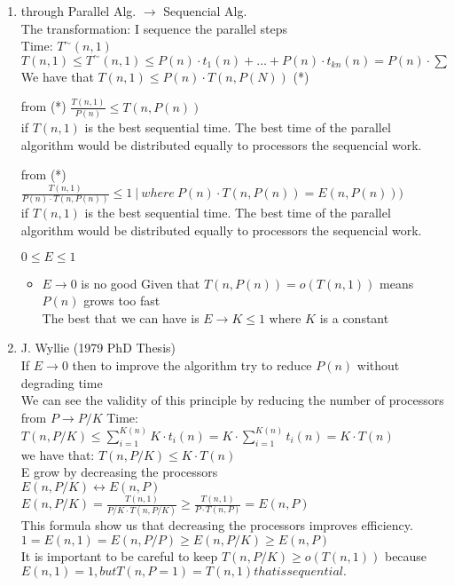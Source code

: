 \begin{enumerate}
 \item through Parallel Alg. $\rightarrow$ Sequencial Alg.\\
 The transformation: I sequence the parallel steps\\
 Time: $T^{\sim}(n,1)$\\
 $T(n,1) \leq T^{\sim}(n,1) \leq P(n) \cdot t_1(n) + \dots + P(n) \cdot t_{kn}(n) = P(n) \cdot \sum$\\
 We have that $T(n, 1) \leq P(n) \cdot T(n, P(N))$ (*)
 \begin{remark}
  from (*) $\frac{T(n,1)}{P(n)} \leq T(n, P(n))$\\
  if $T(n,1)$ is the best sequential time. The best time of the parallel algorithm would be distributed equally to processors the sequencial work.
 \end{remark}
 \begin{remark}
  from (*) $\frac{T(n,1)}{P(n) \cdot T(n,P(n))} \leq 1 \ | \ where \ P(n) \cdot T(n,P(n)) = E(n,P(n)))$\\
  if $T(n,1)$ is the best sequential time. The best time of the parallel algorithm would be distributed equally to processors the sequencial work.
 \end{remark}
 $0 \leq E \leq 1$
 \begin{itemize}
  \item $E \rightarrow 0$ is no good
  Given that $T(n,P(n)) = o(T(n,1))$ means $P(n)$ grows too fast\\
  The best that we can have is $E \rightarrow K \leq 1$ where $K$ is a constant
 \end{itemize}  
 \item J. Wyllie (1979 PhD Thesis)\\
 If $E \rightarrow 0$ then to improve the algorithm try to reduce $P(n)$ without degrading time\\
 We can see the validity of this principle by reducing the number of processors from $P \rightarrow P/K$
 Time:\\
 $T(n,P/K) \leq \sum_{i=1}^{K(n)}K \cdot t_i(n) = K \cdot \sum_{i=1}^{K(n)} t_i(n) = K \cdot T(n)$\\
 we have that: $T(n,P/K) \leq K \cdot T(n)$\\
 E grow by decreasing the processors\\
 $E(n, P/K) \leftrightarrow E(n,P)$\\
 $E(n, P/K) = \frac{T(n,1)}{P/K \cdot T(n, P/K)} \geq \frac{T(n,1)}{P \cdot T(n, P)}  = E(n,P)$\\
 This formula show us that decreasing the processors improves efficiency.\\
 $1 = E(n,1) = E(n, P/P) \geq E(n, P/K) \geq E(n,P)$\\
 It is important to be careful to keep $T(n, P/K) \geq o(T(n,1))$ because $E(n,1) = 1, but T(n, P=1) = T(n,1) that is sequential.$         
\end{enumerate}


